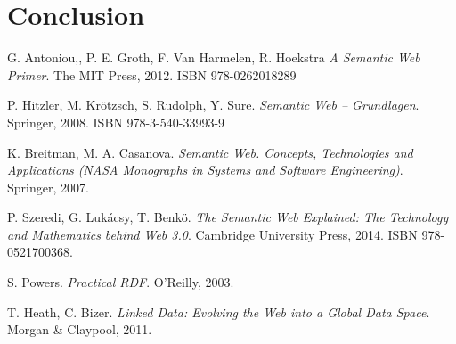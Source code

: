 \documentclass{llncs}
\begin{document}
\section{Conclusion}
\lipsum[3-3]

\begin{thebibliography}{10}
  G. Antoniou,, P. E. Groth, F. Van Harmelen, R. Hoekstra
  \newblock \emph{A Semantic Web Primer}.
  \newblock The MIT Press, 2012. ISBN  978-0262018289

  P. Hitzler, M. Kr\"otzsch, S. Rudolph, Y. Sure. 
  \newblock \emph{Semantic Web – Grundlagen}.
  \newblock Springer, 2008. ISBN 978-3-540-33993-9

  K. Breitman, M. A. Casanova.
  \newblock \emph{Semantic Web. Concepts, Technologies and Applications 
  (NASA Monographs in Systems and Software Engineering)}. 
  \newblock Springer, 2007.

  P. Szeredi, G. Lukácsy, T. Benk\"o. 
  \newblock \emph{The Semantic Web Explained: The Technology and Mathematics 
  behind Web 3.0}. 
  \newblock Cambridge University Press, 2014. ISBN 978-0521700368.

  S. Powers. 
  \newblock \emph{Practical RDF}. 
  \newblock O'Reilly, 2003.

  T. Heath, C. Bizer. 
  \newblock \emph{Linked Data: Evolving the Web into a Global Data Space}. 
  \newblock Morgan \& Claypool, 2011.
\end{thebibliography}

\end{document}
